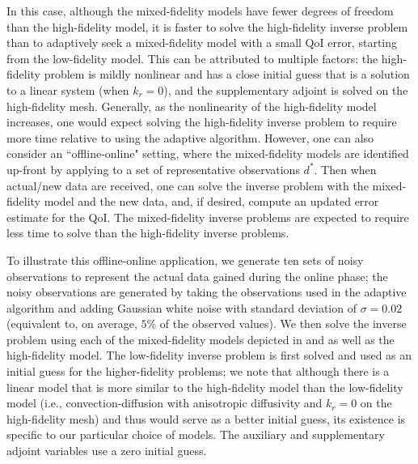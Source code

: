 \documentclass[review,sort&compress]{elsarticle}
\theoremstyle{plain} %
\theoremstyle{definition} %
\begin{document}
In this case, although the mixed-fidelity models have fewer degrees of freedom than the high-fidelity model, it is faster to solve the high-fidelity inverse problem than to adaptively seek a mixed-fidelity model with a small QoI error, starting from the low-fidelity model. This can be attributed to multiple factors: the high-fidelity problem is mildly nonlinear and has a close initial guess that is a solution to a linear system (when $k_r=0$), and the supplementary adjoint is solved on the high-fidelity mesh. Generally, as the nonlinearity of the high-fidelity model increases, one would expect solving the high-fidelity inverse problem to require more time relative to using the adaptive algorithm. However, one can also consider an ``offline-online" setting, where the mixed-fidelity models are identified up-front by applying  to a set of representative observations $d^*$. Then when actual/new data are received, one can solve the inverse problem with the mixed-fidelity model and the new data, and, if desired, compute an updated error estimate for the QoI. The mixed-fidelity inverse problems are expected to require less time to solve than the high-fidelity inverse problems.

To illustrate this offline-online application, we generate ten sets of noisy observations to represent the actual data gained during the online phase; the noisy observations are generated by taking the observations used in the adaptive algorithm and adding Gaussian white noise with standard deviation of $\sigma=0.02$ (equivalent to, on average, $5\%$ of the observed values). We then solve the inverse problem using each of the mixed-fidelity models depicted in  and  as well as the high-fidelity model. The low-fidelity inverse problem is first solved and used as an initial guess for the higher-fidelity problems; we note that although there is a linear model that is more similar to the high-fidelity model than the low-fidelity model (i.e., convection-diffusion with anisotropic diffusivity and $k_r=0$ on the high-fidelity mesh) and thus would serve as a better initial guess, its existence is specific to our particular choice of models. The auxiliary and supplementary adjoint variables use a zero initial guess.
\end{document}
